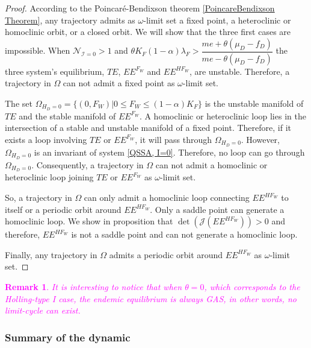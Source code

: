 \documentclass{article}
\newcommand{\cI}{\mathcal{I}}
\newcommand{\YD}[1]{\textcolor{magenta}{#1}}
\newtheorem{remark}{Remark}
\begin{document}
\begin{proof}
According to the Poincaré-Bendixson theorem \ref{PoincareBendixson Theorem}, any trajectory admits as $\omega$-limit set a fixed point, a heteroclinic or homoclinic orbit, or a closed orbit. We will show that the three first cases are impossible.
When $\mathcal{N}_{\cI = 0} > 1$ and $\theta K_{F}(1-\alpha)\lambda_{F} > \dfrac{me+\theta(\mu_{D}-f_{D})}{me-\theta(\mu_{D}-f_{D})}$ the three system's equilibrium, $TE$, $EE^{F_W}$ and $EE^{HF_W}$, are unstable. Therefore, a trajectory in $\Omega$ can not admit a fixed point as $\omega$-limit set.

The set $\Omega_{H_D=0} = \{(0, F_W) | 0 \leq F_W \leq (1-\alpha)K_F \}$ is the unstable manifold of $TE$ and the stable manifold of $EE^{F_W}$. 
A homoclinic or heteroclinic loop lies in the intersection of a stable and unstable manifold of a fixed point. Therefore, if it exists a loop involving $TE$ or $EE^{F_W}$, it will pass through $\Omega_{H_D=0}$. However, $\Omega_{H_D=0}$ is an invariant of system \eqref{QSSA, I=0}. Therefore, no loop can go through $\Omega_{H_D=0}$. Consequently, a trajectory in $\Omega$ can not admit a homoclinic or heteroclinic loop joining $TE$ or $EE^{F_W}$ as $\omega$-limit set.

So, a trajectory in $\Omega$ can only admit a homoclinic loop connecting $EE^{HF_W}$ to itself or a periodic orbit around $EE^{HF_W}$. Only a saddle point can generate a homoclinic loop. We show in proposition that $\det(\mathcal{J}(EE^{HF_W})) > 0$ and therefore, $EE^{HF_W}$ is not a saddle point and can not generate a homoclinic loop. 

Finally, any trajectory in $\Omega$ admits a periodic orbit around $EE^{HF_W}$ as $\omega$-limit set.
\end{proof}

\YD{\begin{remark}
It is interesting to notice that when $\theta=0$, which corresponds to the Holling-type I case, the endemic equilibrium is always GAS, in other words, no limit-cycle can exist.
\end{remark}
}

\subsubsection{Summary of the dynamic}
\end{document}
